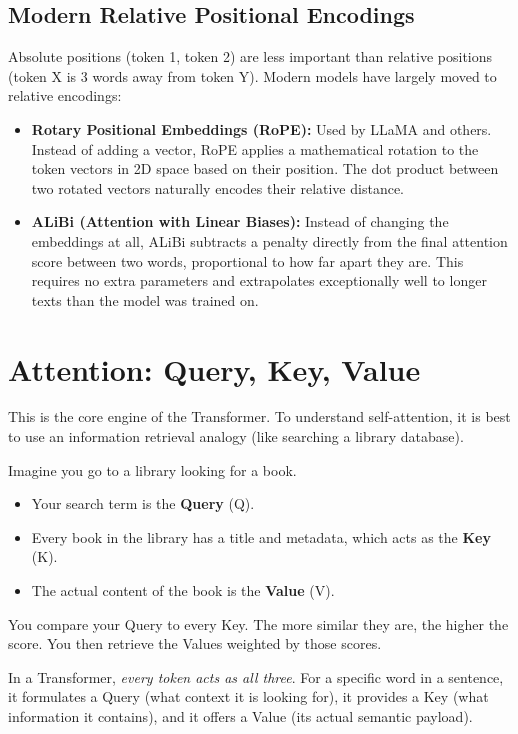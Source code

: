 \documentclass[11pt, a4paper]{article}
\begin{document}
\subsection{Modern Relative Positional Encodings}
Absolute positions (token 1, token 2) are less important than relative positions (token X is 3 words away from token Y). Modern models have largely moved to relative encodings:
\begin{itemize}
    \item \textbf{Rotary Positional Embeddings (RoPE):} Used by LLaMA and others. Instead of adding a vector, RoPE applies a mathematical rotation to the token vectors in 2D space based on their position. The dot product between two rotated vectors naturally encodes their relative distance.
    \item \textbf{ALiBi (Attention with Linear Biases):} Instead of changing the embeddings at all, ALiBi subtracts a penalty directly from the final attention score between two words, proportional to how far apart they are. This requires no extra parameters and extrapolates exceptionally well to longer texts than the model was trained on.
\end{itemize}

\section{Attention: Query, Key, Value}

This is the core engine of the Transformer. To understand self-attention, it is best to use an information retrieval analogy (like searching a library database).

Imagine you go to a library looking for a book. 
\begin{itemize}
    \item Your search term is the \textbf{Query} (Q). 
    \item Every book in the library has a title and metadata, which acts as the \textbf{Key} (K).
    \item The actual content of the book is the \textbf{Value} (V).
\end{itemize}
You compare your Query to every Key. The more similar they are, the higher the score. You then retrieve the Values weighted by those scores.

In a Transformer, \textit{every token acts as all three}. For a specific word in a sentence, it formulates a Query (what context it is looking for), it provides a Key (what information it contains), and it offers a Value (its actual semantic payload).
\end{document}
